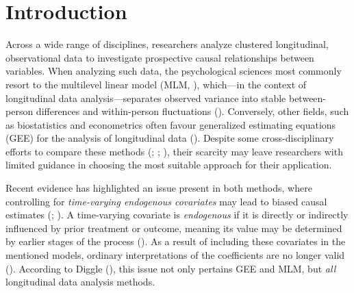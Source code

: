 \documentclass[
  12pt,
  a4paper,
]{article}
\begin{document}

\newpage

\section{Introduction}\label{introduction}

Across a wide range of disciplines, researchers analyze clustered
longitudinal, observational data to investigate prospective causal
relationships between variables. When analyzing such data, the
psychological sciences most commonly resort to the multilevel linear
model (MLM, ),
which---in the context of longitudinal data analysis---separates
observed variance into stable between-person differences and
within-person fluctuations (). Conversely, other fields, such as biostatistics and
econometrics often favour generalized estimating equations (GEE) for the
analysis of longitudinal data (). Despite some cross-disciplinary efforts to compare these
methods (;
; ), their scarcity may leave researchers with limited
guidance in choosing the most suitable approach for their application.

Recent evidence has highlighted an issue present in both methods, where
controlling for \emph{time-varying endogenous covariates} may lead to
biased causal estimates (; ). A time-varying
covariate is \emph{endogenous} if it is directly or indirectly
influenced by prior treatment or outcome, meaning its value may be
determined by earlier stages of the process
(). As a result of including
these covariates in the mentioned models, ordinary interpretations of
the coefficients are no longer valid (). According to Diggle
(), this issue not only pertains GEE and
MLM, but \emph{all} longitudinal data analysis methods.
\end{document}
